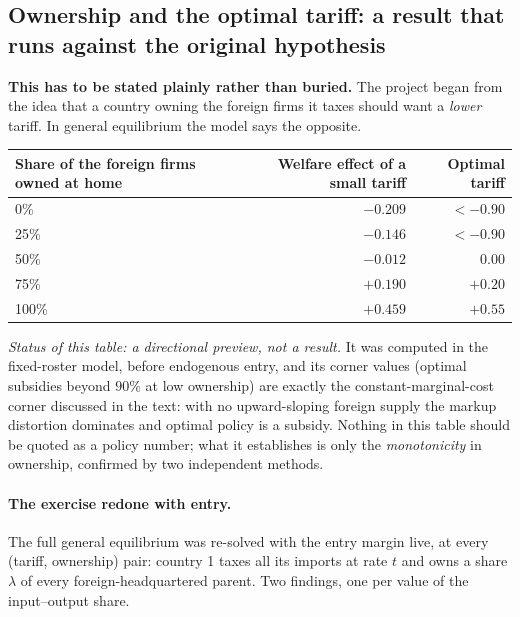 \documentclass[11pt]{article}
\newenvironment{keypoint}
  {\begin{lrbox}{\kbox}\begin{minipage}{0.93\textwidth}\vspace{3pt}}
  {\vspace{3pt}\end{minipage}\end{lrbox}\begin{center}\fbox{\usebox{\kbox}}\end{center}}
\theoremstyle{plain}
\theoremstyle{remark}
\theoremstyle{definition}
\begin{document}
\subsection{Ownership and the optimal tariff: a result that runs against the original hypothesis}
\label{sec:tariff}

\begin{keypoint}
\textbf{This has to be stated plainly rather than buried.} The project began from the
idea that a country owning the foreign firms it taxes should want a \emph{lower}
tariff. In general equilibrium the model says the opposite.

\begin{center}
\begin{tabular}{lrr}
\toprule
Share of the foreign firms owned at home & Welfare effect of a small tariff & Optimal tariff\\
\midrule
0\%   & $-0.209$ & $<-0.90$\\
25\%  & $-0.146$ & $<-0.90$\\
50\%  & $-0.012$ & $0.00$\\
75\%  & $+0.190$ & $+0.20$\\
100\% & $+0.459$ & $+0.55$\\
\bottomrule
\end{tabular}
\end{center}

\smallskip
\noindent\emph{Status of this table: a directional preview, not a result.} It was
computed in the fixed-roster model, before endogenous entry, and its corner values
(optimal subsidies beyond $90\%$ at low ownership) are exactly the constant-marginal-cost
corner discussed in the text: with no upward-sloping foreign supply the markup
distortion dominates and optimal policy is a subsidy. Nothing in this table should be
quoted as a policy number; what it establishes is only the \emph{monotonicity} in
ownership, confirmed by two independent methods.
\end{keypoint}

\paragraph{The exercise redone with entry.} The full general equilibrium was re-solved
with the entry margin live, at every (tariff, ownership) pair: country 1 taxes all its
imports at rate $t$ and owns a share $\lambda$ of every foreign-headquartered parent.
Two findings, one per value of the input--output share.
\end{document}
